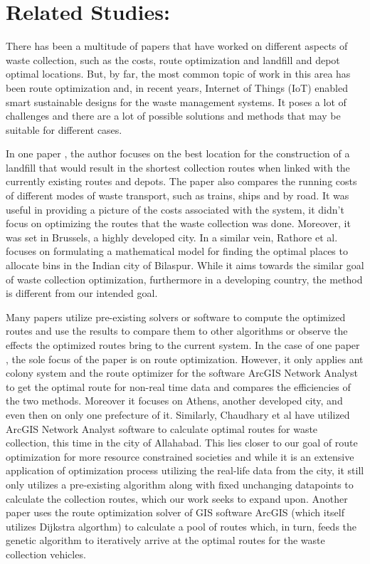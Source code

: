 \documentclass[12pt]{article}
\begin{document}
\section{Related Studies:}

There has been a multitude of papers that have worked on different aspects of waste collection, such as the costs, route optimization and landfill and depot optimal locations. But, by far, the most common topic of work in this area has been route optimization and, in recent years, Internet of Things (IoT) enabled smart sustainable designs for the waste management systems. It poses a lot of challenges and there are a lot of possible solutions and methods that may be suitable for different cases. 

In one paper \cite{kulcar1996optimizing}, the author focuses on the best location for the construction of a landfill that would result in the shortest collection routes when linked with the currently existing routes and depots. The paper also compares the running costs of different modes of waste transport, such as trains, ships and by road. It was useful in providing a picture of the costs associated with the system, it didn't focus on optimizing the routes that the waste collection was done. Moreover, it was set in Brussels, a highly developed city. In a similar vein, Rathore et al. \cite{rathore2020location} focuses on formulating a mathematical model for finding the optimal places to allocate bins in the Indian city of Bilaspur. While it aims towards the similar goal of waste collection optimization, furthermore in a developing country, the method is different from our intended goal.

Many papers utilize pre-existing solvers or software to compute the optimized routes and use the results to compare them to other algorithms or observe the effects the optimized routes bring to the current system. In the case of one paper \cite{karadimas2008routing}, the sole focus of the paper is on route optimization. However, it only applies ant colony system and the route optimizer for the software ArcGIS Network Analyst to get the optimal route for non-real time data and compares the efficiencies of the two methods. Moreover it focuses on Athens, another developed city, and even then on only one prefecture of it. Similarly, Chaudhary et al \cite{chaudhary2019gis} have utilized ArcGIS Network Analyst software to calculate optimal routes for waste collection, this time in the city of Allahabad. This lies closer to our goal of route optimization for more resource constrained societies and while it is an extensive application of optimization process utilizing the real-life data from the city, it still only utilizes a pre-existing algorithm along with fixed unchanging datapoints to calculate the collection routes, which our work seeks to expand upon. Another paper \cite{amal2018sga} uses the route optimization solver of GIS software ArcGIS (which itself utilizes Dijkstra algorthm) to calculate a pool of routes which, in turn, feeds the genetic algorithm to iteratively arrive at the optimal routes for the waste collection vehicles.
\end{document}
